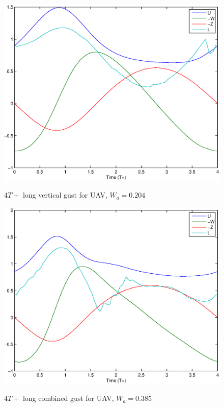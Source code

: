     \begin{figure}[h]
      \begin{center}
	\scalebox{0.8}
	{\includegraphics{./Figures/Windtype=1_Tg=4_Wg=0p204_UAV_alphamax=12.eps}}
      \end{center}
      \caption{$4T+$ long vertical gust for UAV, $W_a=0.204$}
      \label{fig:vertical_optimization_UAV}
    \end{figure}


    \begin{figure}[h]
      \begin{center}
	\scalebox{0.8}
	{\includegraphics{./Figures/Windtype=3_Tg=4_Wg=0p385_UAV_alphamax=12.eps}}
      \end{center}
      \caption{$4T+$ long combined gust for UAV, $W_a=0.385$}
      \label{fig:combined_optimization_UAV}
    \end{figure}

